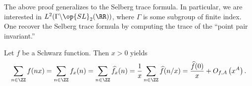 \documentclass[../notes.tex]{subfiles}
\begin{document}
\begin{remark}
	The above proof generalizes to the Selberg trace formula. In particular, we are interested in $L^2(\Gamma\backslash\op{SL}_2(\RR))$, where $\Gamma$ is some subgroup of finite index. One recover the Selberg trace formula by computing the trace of the ``point pair invariant.''
\end{remark}
\begin{example}
	Let $f$ be a Schwarz function. Then $x>0$ yields
	\[\sum_{n\in\ZZ}f(nx)=\sum_{n\in\ZZ}f_x(n)=\sum_{n\in\ZZ}\widehat{f_x}(n)=\frac1x\sum_{n\in\ZZ}\widehat f(n/x)=\frac{\widehat f(0)}x+O_{f,A}\left(x^A\right).\]
\end{example}
\end{document}
